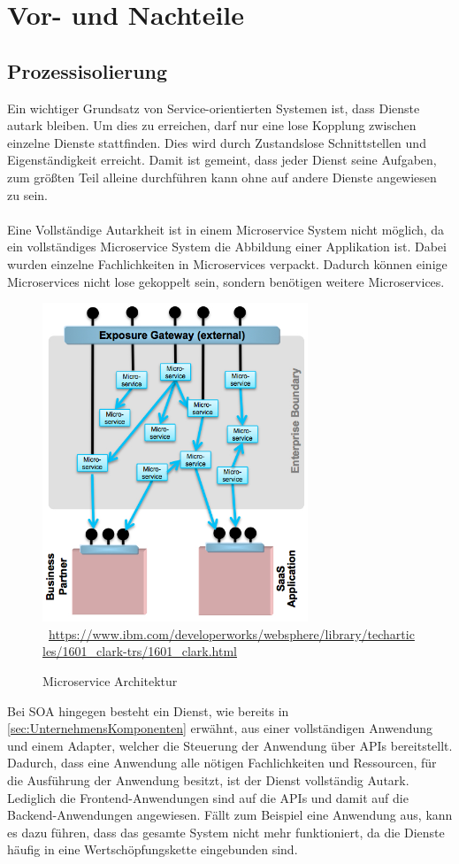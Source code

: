 \section{Vor- und Nachteile}
\label{sec:VorUndNachteile}

\subsection{Prozessisolierung}
\label{subsec:Prozessisiolierung}
Ein wichtiger Grundsatz von Service-orientierten Systemen ist, dass Dienste autark bleiben. Um dies zu erreichen, darf nur eine lose Kopplung zwischen einzelne Dienste stattfinden. Dies wird durch Zustandslose Schnittstellen und Eigenständigkeit erreicht. Damit ist gemeint, dass jeder Dienst seine Aufgaben, zum größten Teil alleine durchführen kann ohne auf andere Dienste angewiesen zu sein.
\\\\
Eine Vollständige Autarkheit ist in einem Microservice System nicht möglich, da ein vollständiges Microservice System die Abbildung einer Applikation ist. Dabei wurden einzelne Fachlichkeiten in Microservices verpackt. Dadurch können einige Microservices nicht lose gekoppelt sein, sondern benötigen weitere Microservices.

\begin{figure}[htb]
    \centering 
    \includegraphics[width=300px]{content/images/figure6}\
    \quelle\url{https://www.ibm.com/developerworks/websphere/library/techarticles/1601_clark-trs/1601_clark.html}
    \caption{Microservice Architektur}
    \label{fig:MicroserviceArchitekturInGreenField} 
\end{figure}
\newpage
Bei SOA hingegen besteht ein Dienst, wie bereits in \ref{sec:UnternehmensKomponenten}  erwähnt, aus einer vollständigen Anwendung und einem Adapter, welcher die Steuerung der Anwendung über APIs bereitstellt. Dadurch, dass eine Anwendung alle nötigen Fachlichkeiten und Ressourcen, für die Ausführung der Anwendung besitzt, ist der Dienst vollständig Autark. Lediglich die Frontend-Anwendungen sind auf die APIs und damit auf die Backend-Anwendungen angewiesen. Fällt zum Beispiel eine Anwendung aus, kann es dazu führen, dass das gesamte System nicht mehr funktioniert, da die Dienste häufig in eine Wertschöpfungskette eingebunden sind.

